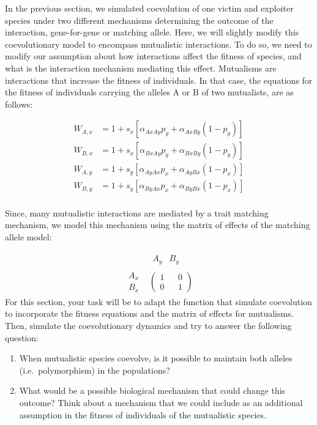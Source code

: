 \documentclass[
]{book}
\begin{document}
In the previous section, we simulated coevolution of one victim and exploiter species under two different mechanisms determining the outcome of the interaction, gene-for-gene or matching allele. Here, we will slightly modify this coevolutionary model to encompass mutualistic interactions. To do so, we need to modify our assumption about how interactions affect the fitness of species, and what is the interaction mechanism mediating this effect. Mutualisms are interactions that increase the fitness of individuals. In that case, the equations for the fitness of individuals carrying the alleles A or B of two mutualists, are as follows:

\[\begin{aligned}
W_{A,x}&=1+s_{x}\left[\alpha_{AxAy}p_{y}+\alpha_{AxBy}(1-p_{y})\right] \\
W_{B,x}&=1+s_{x}\left[\alpha_{BxAy}p_{y}+\alpha_{BxBy}(1-p_{y})\right] \\
W_{A,y}&=1+s_{y}\left[\alpha_{AyAx}p_{x}+\alpha_{AyBx}(1-p_{x})\right] \\
W_{B,y}&=1+s_{y}\left[\alpha_{ByAx}p_{x}+\alpha_{ByBx}(1-p_{x})\right] \\
\end{aligned}\]

Since, many mutualistic interactions are mediated by a trait matching mechanism, we model this mechanism using the matrix of effects of the matching allele model:

\[
\begin{array}{cc} &
\begin{array}{cc} A_{y} & B_{y} \end{array}
\\
\begin{array}{cc}
A_{x} \\
B_{x} \end{array}
&
\left(
\begin{array}{cc}
1 && 0 \\
0 && 1 \end{array}
\right)\end{array}
\]
For this section, your task will be to adapt the function that simulate coevolution to incorporate the fitness equations and the matrix of effects for mutualisms. Then, simulate the coevolutionary dynamics and try to answer the following question:

\begin{enumerate}
\def\labelenumi{\arabic{enumi}.}
\item
  When mutualistic species coevolve, is it possible to maintain both alleles (i.e.~polymorphism) in the populations?
\item
  What would be a possible biological mechanism that could change this outcome? Think about a mechanism that we could include as an additional assumption in the fitness of individuals of the mutualistic species.
\end{enumerate}
\end{document}
